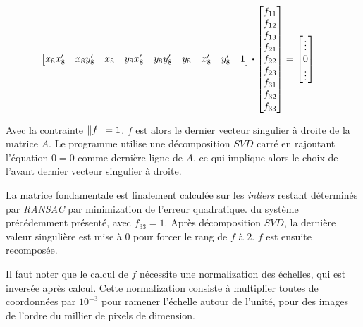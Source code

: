 \documentclass[12pt,a4paper,onecolumn]{article}
\begin{document}
\begin{equation*}
\begin{split}
\begin{bmatrix}
			x_8x_8^{\prime} & x_8y_8^{\prime} & x_8 & y_8x_8^{\prime} & y_8y_8^{\prime} & y_8 & x_8^{\prime} & y_8^{\prime} & 1
		\end{bmatrix}
		\dotproduct
		\begin{bmatrix}
			f_{11} \\
			f_{12} \\
			f_{13} \\
			f_{21} \\
			f_{22} \\
			f_{23} \\
			f_{31} \\
			f_{32} \\
			f_{33}
		\end{bmatrix}
		&=
		\begin{bmatrix}
			\vdots \\
			0      \\
			\vdots
		\end{bmatrix}
	\end{split}
\end{equation*}

Avec la contrainte \( \norm{f} = 1\). \( f\) est alors le dernier vecteur singulier à droite de la matrice \( A\). Le programme utilise une décomposition \(SVD\) carré en rajoutant l'équation \( 0 = 0\) comme dernière ligne de \(A\), ce qui implique alors le choix de l'avant dernier vecteur singulier à droite.

La matrice fondamentale est finalement calculée sur les \textit{inliers} restant déterminés par \textit{RANSAC} par minimization de l'erreur quadratique. du système précédemment présenté, avec \( f_{33} = 1\). Après décomposition \(SVD\), la dernière valeur singulière est mise à 0 pour forcer le rang de \( f\) à 2. \(f\) est ensuite recomposée.

Il faut noter que le calcul de \(f\) nécessite une normalization des échelles, qui est inversée après calcul. Cette normalization consiste à multiplier toutes de coordonnées par \( 10^{-3} \) pour ramener l'échelle autour de l'unité, pour des images de l'ordre du millier de pixels de dimension.
\end{document}
